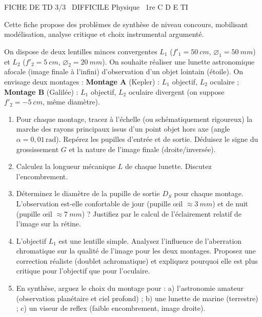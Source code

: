 \documentclass[11pt]{article}
\begin{document}
\begin{tcolorbox}[enhanced,colback=popink,colframe=popink,arc=10pt,boxrule=0pt,left=12pt,right=12pt,top=9pt,bottom=9pt]
{\color{white}\popxbold\small FICHE DE TD 3/3 \textbullet\ DIFFICILE \hfill Physique \textbullet\ 1re C D E TI\par}
\end{tcolorbox}
\vspace{4pt}
Cette fiche propose des problèmes de synthèse de niveau concours, mobilisant modélisation, analyse critique et choix instrumental argumenté.

\begin{exercice}
On dispose de deux lentilles minces convergentes $L_1$ ($f'_1 = \SI{50}{cm}$, $\varnothing_1 = \SI{50}{mm}$) et $L_2$ ($f'_2 = \SI{5}{cm}$, $\varnothing_2 = \SI{20}{mm}$). On souhaite réaliser une lunette astronomique afocale (image finale à l'infini) d'observation d'un objet lointain (étoile). On envisage deux montages : \textbf{Montage A} (Kepler) : $L_1$ objectif, $L_2$ oculaire ; \textbf{Montage B} (Galilée) : $L_1$ objectif, $L_2$ oculaire divergent (on suppose $f'_2 = -\SI{5}{cm}$, même diamètre).
\begin{enumerate}
    \item Pour chaque montage, tracez à l'échelle (ou schématiquement rigoureux) la marche des rayons principaux issus d'un point objet hors axe (angle $\alpha = 0,01\,\text{rad}$). Repérez les pupilles d'entrée et de sortie. Déduisez le signe du grossissement $G$ et la nature de l'image finale (droite/inversée).
    \item Calculez la longueur mécanique $L$ de chaque lunette. Discutez l'encombrement.
    \item Déterminez le diamètre de la pupille de sortie $D_S$ pour chaque montage. L'observation est-elle confortable de jour (pupille œil $\approx \SI{3}{mm}$) et de nuit (pupille œil $\approx \SI{7}{mm}$) ? Justifiez par le calcul de l'éclairement relatif de l'image sur la rétine.
    \item L'objectif $L_1$ est une lentille simple. Analysez l'influence de l'aberration chromatique sur la qualité de l'image pour les deux montages. Proposez une correction réaliste (doublet achromatique) et expliquez pourquoi elle est plus critique pour l'objectif que pour l'oculaire.
    \item En synthèse, arguez le choix du montage pour : a) l'astronomie amateur (observation planétaire et ciel profond) ; b) une lunette de marine (terrestre) ; c) un viseur de reflex (faible encombrement, image droite).
\end{enumerate}
\end{exercice}
\end{document}
